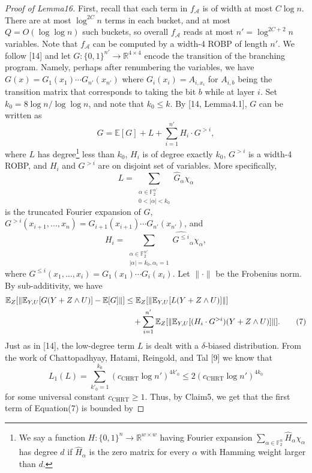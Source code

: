 \documentclass[10pt,a4paper]{article}
\begin{document}
\begin{proof}[Proof of Lemma16]
First, recall that each term in $f_{\mathcal A}$ is of width at most $C\log n$. There are at most $\log^{2C}n$ terms in each bucket, and at most $Q=O(\log\log n)$ such buckets, so overall $f_{\mathcal A}$ reads at most $n'=\log^{2C+2}n$ variables.
Note that $f_{\mathcal A}$ can be computed by a width-4 ROBP of length $n'$. We follow [14] and let $G:\{0,1\}^{n'}\to\mathbb R^{4\times4}$ encode the transition of the branching program. Namely, perhaps after renumbering the variables, we have $G(x)=G_1(x_1)\cdots G_{n'}(x_{n'})$ where $G_i(x_i)=A_{i,x_i}$ for $A_{i,b}$ being the transition matrix that corresponds to taking the bit $b$ while at layer $i$. Set $k_0=8\log n/\log\log n$, and note that $k_0\le k$. By [14, Lemma4.1], $G$ can be written as
\[
G=\mathbb E[G]+L+\sum_{i=1}^{n'}H_i\cdot G^{>i},
\]
where $L$ has degree\footnote{We say a function $H:\{0,1\}^n\to\mathbb R^{w\times w}$ having Fourier expansion $\sum_{\alpha\in\mathbb F_2^n}\widehat H_\alpha\chi_\alpha$ has degree $d$ if $\widehat H_\alpha$ is the zero matrix for every $\alpha$ with Hamming weight larger than $d$.} less than $k_0$, $H_i$ is of degree exactly $k_0$, $G^{>i}$ is a width-4 ROBP, and $H_i$ and $G^{>i}$ are on disjoint set of variables. More specifically,
\[
L=\sum_{\substack{\alpha\in\mathbb F_2^{n'}\\0<|\alpha|<k_0}}\widehat G_\alpha\chi_\alpha
\]
is the truncated Fourier expansion of $G$, $G^{>i}(x_{i+1},\ldots,x_n)=G_{i+1}(x_{i+1})\cdots G_{n'}(x_{n'})$, and
\[
H_i=\sum_{\substack{\alpha\in\mathbb F_2^{n'}\\|\alpha|=k_0,\alpha_i=1}}\widehat{G^{\le i}}_\alpha\chi_\alpha,
\]
where $G^{\le i}(x_1,\ldots,x_i)=G_1(x_1)\cdots G_i(x_i)$. Let $\|\cdot\|$ be the Frobenius norm. By sub-additivity, we have
\begin{align}
\mathbb E_Z[\|\mathbb E_{Y,U}[G(Y+Z\wedge U)]-\mathbb E[G]\|]
&\le\mathbb E_Z[\|\mathbb E_{Y,U}[L(Y+Z\wedge U)]\|]\notag\\
&\quad+\sum_{i=1}^{n'}\mathbb E_Z[\|\mathbb E_{Y,U}[(H_i\cdot G^{>i})(Y+Z\wedge U)]\|].\tag{7}
\end{align}
Just as in [14], the low-degree term $L$ is dealt with a $\delta$-biased distribution. From the work of Chattopadhyay, Hatami, Reingold, and Tal [9] we know that
\[
L_1(L)=\sum_{k'_0=1}^{k_0}(c_{\mathrm{CHRT}}\log n')^{4k'_0}\le2(c_{\mathrm{CHRT}}\log n')^{4k_0}
\]
for some universal constant $c_{\mathrm{CHRT}}\ge1$. Thus, by Claim5, we get that the first term of Equation(7) is bounded by

\end{proof}
\end{document}
